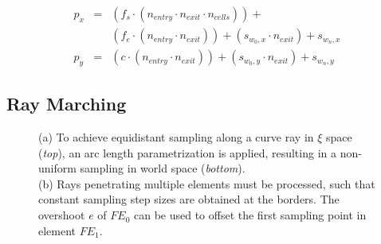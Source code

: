 \documentclass[journal]{vgtc}                %
\begin{document}
\begin{eqnarray*}
p_x & = &(f_s \cdot (n_{entry} \cdot n_{exit} \cdot n_{cells})) + \\
	&  &(f_e \cdot (n_{entry} \cdot n_{exit})) + (s_{w_0,x} \cdot n_{exit}) + s_{w_n,x}\\
p_y & = &(c   \cdot (n_{entry} \cdot n_{exit})) + (s_{w_0,y} \cdot n_{exit}) + s_{w_n,y}
\end{eqnarray*}

\subsection{Ray Marching}

\begin{figure}[b]
\centering
{}
\protect\caption{(a) To achieve equidistant sampling along a curve ray in $\xi$ space ({\it top}), an arc length parametrization is applied, resulting in a non-uniform sampling in world space ({\it bottom}).\\ (b) Rays penetrating multiple elements must be processed, such that constant sampling step sizes are obtained at the borders. The overshoot $e$ of $FE_0$ can be used to offset the first sampling point in element $FE_1$.}
\label{fig:arclength}
\end{figure}

\end{document}
